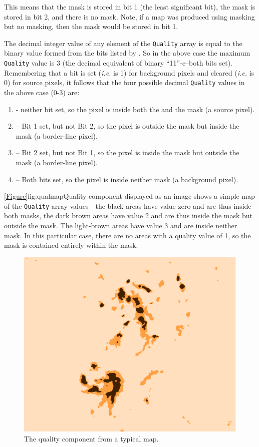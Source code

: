 This means that the  mask is stored in bit 1 (the least significant
bit), the  mask is stored in bit 2, and there is no 
mask. Note, if
a map was produced using  masking but no  masking,
then the  mask would be stored in bit 1.

The decimal integer value of any element of the \texttt{Quality} array is
equal to the binary value formed from the bits listed by .
So in the above case the maximum \texttt{Quality} value is 3 (the decimal
equivalent of binary ``11''-e--both bits set). Remembering that a bit is set
(\emph{i.e.} is 1) for background pixels and cleared (\emph{i.e.} is 0) for
source pixels, it follows that the four possible decimal \texttt{Quality}
values in the above case (0-3) are:

\begin{enumerate}
\item - neither bit set, so the pixel is inside both the  and the  mask
(a source pixel).

\item -- Bit 1 set, but not Bit 2, so the pixel is outside the  mask but
inside the  mask (a border-line pixel).

\item -- Bit 2 set, but not Bit 1, so the pixel is inside the  mask but
outside the  mask (a border-line pixel).

\item -- Both bits set, so the pixel is inside neither mask (a background
pixel).
\end{enumerate}

\cref{Figure}{fig:qualmap}{Quality component displayed as an image} shows
a simple map of the \texttt{Quality} array values---the black areas have
value zero and are thus inside both masks, the dark brown areas have value 2
and are thus inside the  mask but outside the  mask.
The light-brown areas have value 3 and are inside neither mask. In this
particular case, there are no  areas with a quality value of 1, so the
 mask is contained entirely within the  mask.

\begin{figure}[t!]
\includegraphics[width=0.6\linewidth]{sc21_qual}
\caption[Quality component displayed as an image]{The quality component
from a typical map.}
\label{fig:qualmap}
\end{figure}

